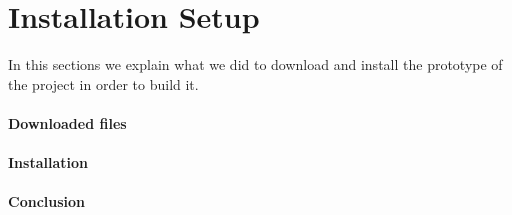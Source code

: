 \section{Installation Setup}
In this sections we explain what we did to download and install the prototype
of the project in order to build it.\\\\
\textbf{Downloaded files}\\\\
\textbf{Installation}\\\\
\textbf{Conclusion}\\\\